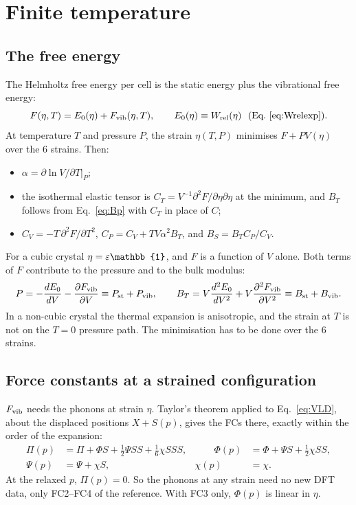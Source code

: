 \documentclass[11pt,a4paper]{article}
\newcommand{\Id}{\mathbb{1}}
\begin{document}
\section{Finite temperature}
\subsection{The free energy}
The Helmholtz free energy per cell is the static energy plus the vibrational free energy:
\begin{equation}
F(\eta,T)=E_0(\eta)+F_{\rm vib}(\eta,T),\qquad E_0(\eta)\equiv W_{\rm rel}(\eta)\ \ \text{(Eq.~\eqref{eq:Wrelexp})}.
\label{eq:F}
\end{equation}
At temperature $T$ and pressure $P$, the strain $\eta(T,P)$ minimises $F+PV(\eta)$ over the 6 strains. Then:
\begin{itemize}
\item $\alpha=\partial\ln V/\partial T|_P$;
\item the isothermal elastic tensor is $C_T=V^{-1}\partial^2F/\partial\eta\partial\eta$ at the minimum, and $B_T$ follows
  from Eq.~\eqref{eq:Bp} with $C_T$ in place of $C$;
\item $C_V=-T\,\partial^2F/\partial T^2$, $C_P=C_V+TV\alpha^2B_T$, and $B_S=B_TC_P/C_V$.
\end{itemize}
For a cubic crystal $\eta=\ep\Id$, and $F$ is a function of $V$ alone. Both terms of $F$ contribute to the pressure
and to the bulk modulus:
\[
P=-\frac{dE_0}{dV}-\frac{\partial F_{\rm vib}}{\partial V}\equiv P_{\rm st}+P_{\rm vib},\qquad
B_T=V\frac{d^2E_0}{dV^2}+V\frac{\partial^2F_{\rm vib}}{\partial V^2}\equiv B_{\rm st}+B_{\rm vib}.
\]
In a non-cubic crystal the thermal expansion is anisotropic, and the strain at $T$ is not on the $T=0$
pressure path. The minimisation has to be done over the 6 strains.

\subsection{Force constants at a strained configuration}
$F_{\rm vib}$ needs the phonons at strain $\eta$. Taylor's theorem applied to Eq.~\eqref{eq:VLD}, about the
displaced positions $X+S(p)$, gives the FCs there, exactly within the order of the expansion:
\begin{equation}
\begin{aligned}
\Pi(p)&=\Pi+\Phi S+\tfrac12\Psi SS+\tfrac16\chi SSS, &\qquad \Phi(p)&=\Phi+\Psi S+\tfrac12\chi SS,\\
\Psi(p)&=\Psi+\chi S, & \chi(p)&=\chi .
\end{aligned}
\label{eq:reexp}
\end{equation}
At the relaxed $p$, $\Pi(p)=0$. So the phonons at any strain need no new DFT data, only FC2--FC4 of the
reference. With FC3 only, $\Phi(p)$ is linear in $\eta$.
\end{document}
